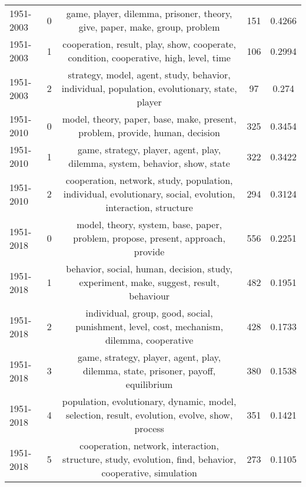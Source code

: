 \begin{tabular}{llccc}
 \midrule
 1951-2003 &               0 &                                    game, player, dilemma, prisoner, theory, give, paper, make, group, problem &              151 &                  0.4266 \\
 1951-2003 &               1 &                         cooperation, result, play, show, cooperate, condition, cooperative, high, level, time &              106 &                  0.2994 \\
 1951-2003 &               2 &                  strategy, model, agent, study, behavior, individual, population, evolutionary, state, player &               97 &                   0.274 \\
 \midrule
 1951-2010 &               0 &                                  model, theory, paper, base, make, present, problem, provide, human, decision &              325 &                  0.3454 \\
 1951-2010 &               1 &                                   game, strategy, player, agent, play, dilemma, system, behavior, show, state &              322 &                  0.3422 \\
 1951-2010 &               2 &  cooperation, network, study, population, individual, evolutionary, social, evolution, interaction, structure &              294 &                  0.3124 \\
 \midrule
 1951-2018 &               0 &                              model, theory, system, base, paper, problem, propose, present, approach, provide &              556 &                  0.2251 \\
 1951-2018 &               1 &                        behavior, social, human, decision, study, experiment, make, suggest, result, behaviour &              482 &                  0.1951 \\
 1951-2018 &               2 &                     individual, group, good, social, punishment, level, cost, mechanism, dilemma, cooperative &              428 &                  0.1733 \\
 1951-2018 &               3 &                            game, strategy, player, agent, play, dilemma, state, prisoner, payoff, equilibrium &              380 &                  0.1538 \\
 1951-2018 &               4 &                 population, evolutionary, dynamic, model, selection, result, evolution, evolve, show, process &              351 &                  0.1421 \\
 1951-2018 &               5 &       cooperation, network, interaction, structure, study, evolution, find, behavior, cooperative, simulation &              273 &                  0.1105 \\
\bottomrule
\end{tabular}
